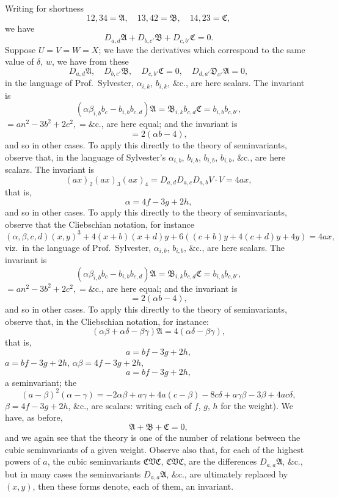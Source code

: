 \documentclass[12pt,a4paper]{article}
\theoremstyle{definition}
\begin{document}
\noindent Writing for shortness
\[
12, 34 = \mathfrak{A}, \quad 13, 42 = \mathfrak{B}, \quad 14, 23 = \mathfrak{C},
\]
we have
\[
D_{a,d}\mathfrak{A} + D_{b,c'}\mathfrak{B} + D_{c,b'}\mathfrak{C} = 0.
\]
Suppose $U = V = W = X$; we have the derivatives which correspond to the same value of $\delta$, $w$, we have from these
\[
D_{a,d}\mathfrak{A}, \quad D_{b,c'}\mathfrak{B}, \quad D_{c,b'}\mathfrak{C} = 0, \quad D_{d,a'}\mathfrak{D}_{x'}\mathfrak{A} = 0,
\]
in the language of Prof.\ Sylvester, $\alpha_{i,k}$, $b_{i,k}$, $\&\text{c.}$, are here scalars. The invariant is
\[
(\alpha\beta_{i,b}b_{c} - b_{i,b}b_{c,d})\mathfrak{A} = \mathfrak{B}_{i,k}b_{c,d}\mathfrak{C} = b_{i,b}b_{c,b'},
\]
$= an^2 - 3b^2 + 2c^2, = \&\text{c.}$, are here equal; and the invariant is
\[
= 2(\alpha b - 4),
\]
and so in other cases. To apply this directly to the theory of seminvariants, observe that, in the language of Sylvester's $\alpha_{i,b}$, $b_{i,b}$, $b_{i,b}$, $b_{i,b}$, $\&\text{c.}$, are here scalars. The invariant is
\[
(ax)_2(ax)_3(ax)_4 = D_{a,d}D_{a,c}D_{a,b}V \cdot V = 4ax,
\]
that is,
\[
\alpha = 4f - 3g + 2h,
\]
and so in other cases. To apply this directly to the theory of seminvariants, observe that the Cliebschian notation, for instance
\[
(\alpha, \beta, c, d)(x, y)^3 + 4(x + b)(x + d)y + 6((c + b)y + 4(c + d)y + 4y) = 4ax,
\]
viz.\ in the language of Prof.\ Sylvester, $\alpha_{i,b}$, $b_{i,b}$, $\&\text{c.}$, are here scalars. The invariant is
\[
(\alpha\beta_{i,b}b_{c} - b_{i,b}b_{c,d})\mathfrak{A} = \mathfrak{B}_{i,k}b_{c,d}\mathfrak{C} = b_{i,b}b_{c,b'},
\]
$= an^2 - 3b^2 + 2c^2, = \&\text{c.}$, are here equal; and the invariant is
\[
= 2(\alpha b - 4),
\]
and so in other cases. To apply this directly to the theory of seminvariants, observe that, in the Cliebschian notation, for instance:
\[
(\alpha\beta + \alpha\delta - \beta\gamma)\mathfrak{A} = 4(\alpha\delta - \beta\gamma),
\]
that is,
\[
a = bf - 3g + 2h,
\]
$a = bf - 3g + 2h$, $\alpha\beta = 4f - 3g + 2h$,
\[
a = bf - 3g + 2h,
\]
a seminvariant; the
\[
(a - \beta)^2(\alpha - \gamma) = - 2\alpha\beta + a\gamma + 4a(c - \beta) - 8c\delta + a\gamma\beta - 3\beta + 4ac\delta,
\]
$\beta = 4f - 3g + 2h$, $\&\text{c.}$, are scalars: writing each of $f$, $g$, $h$ for the weight). We have, as before,
\[
\mathfrak{A} + \mathfrak{B} + \mathfrak{C} = 0,
\]
and we again see that the theory is one of the number of relations between the cubic seminvariants of a given weight. Observe also that, for each of the highest powers of $a$, the cubic seminvariants $\mathfrak{C}\mathfrak{V}\mathfrak{C}$, $\mathfrak{C}\mathfrak{V}\mathfrak{C}$, are the differences $D_{a,a}\mathfrak{A}$, $\&\text{c.}$, but in many cases the seminvariants $D_{a,a}\mathfrak{A}$, $\&\text{c.}$, are ultimately replaced by $(x, y)$, then these forms denote, each of them, an invariant.
\end{document}
